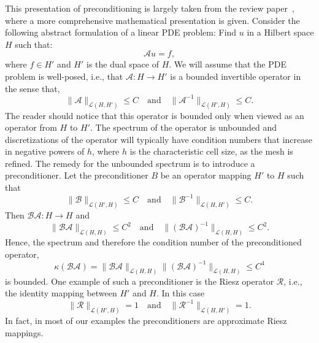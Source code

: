 This presentation of preconditioning is largely taken from the
review paper~\cite{MardalWinther}, where a more comprehensive mathematical
presentation is given. Consider the following abstract formulation
of a linear PDE problem:  
Find $u$ in a Hilbert space $H$ such that: 
\begin{equation}
\mathcal{A} u = f,  
\end{equation}
where $f\in H'$ and $H'$ is the dual space of $H$.  
We will assume that the PDE problem is well-posed, i.e., 
that $\mathcal{A} : H \rightarrow H'$ is a bounded invertible operator in the sense that,  
\begin{equation}
\|\mathcal{A}\|_{\mathcal{L} (H, H')} \le C \quad \mbox{and} \quad  
\|\mathcal{A}^{-1}\|_{\mathcal{L} (H', H)} \le C. 
\end{equation}
The reader should notice that this operator is bounded only when 
viewed as an operator from $H$ to $H'$. 
The spectrum of the operator is unbounded and   
discretizations of the operator will typically have  
condition numbers that increase 
in negative powers of $h$, where $h$ is the
characteristic cell size, as the mesh is refined. 
The remedy for the unbounded spectrum is to introduce a preconditioner. 
Let the preconditioner $B$ be an operator
mapping $H'$ to $H$ such that  
\begin{equation}
\|\mathcal{B}\|_{\mathcal{L}(H', H)} \le C \quad \mbox{and} \quad   
\|\mathcal{B}^{-1}\|_{\mathcal{L}(H, H')} \le C. 
\end{equation}
Then 
$\mathcal{B}\mathcal{A}: H \rightarrow H$ and 
\begin{equation}
\|\mathcal{B}\mathcal{A}\|_{\mathcal{L}(H, H)} \le C^2 \quad \mbox{and} \quad  
\|(\mathcal{B}\mathcal{A})^{-1}\|_{\mathcal{L}(H, H)} \le C^2. 
\end{equation}
Hence, the spectrum and therefore the condition number of the
preconditioned operator, 
\begin{equation}
\kappa(\mathcal{B}\mathcal{A}) = \|\mathcal{B}\mathcal{A}\|_{\mathcal{L}(H, H)} \|(\mathcal{B}\mathcal{A})^{-1}\|_{\mathcal{L}(H, H)} \le C^4  
\end{equation}
is bounded.  One example of such a preconditioner is the Riesz operator $\mathcal{R}$, i.e.,  the identity mapping between $H'$ and $H$.  
In this case 
\begin{equation}
\|\mathcal{R}\|_{\mathcal{L}(H', H)} = 1 \quad \mbox{and} \quad   
\|\mathcal{R}^{-1}\|_{\mathcal{L}(H, H')} = 1. 
\end{equation}
In fact, in most of our examples the preconditioners are approximate Riesz mappings.  

